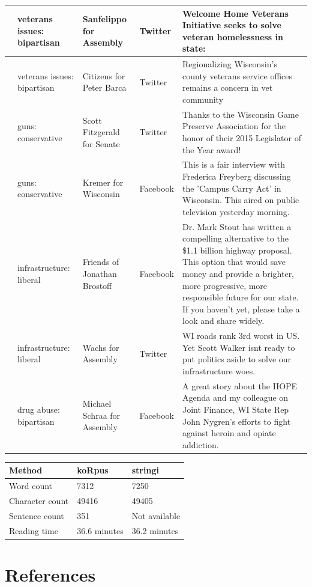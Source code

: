 \documentclass[12pt,]{article}
\begin{document}
\begin{longtable}[t]{>{\raggedright\arraybackslash}p{.65in}|>{\raggedright\arraybackslash}p{.6in}|>{\raggedright\arraybackslash}p{.7in}|>{\raggedright\arraybackslash}p{.6in}|>{\raggedright\arraybackslash}p{3in}}
\hline
6 & veterans issues: bipartisan & Sanfelippo for Assembly & Twitter & Welcome Home Veterans Initiative seeks to solve veteran homelessness in state:\\
\hline
7 & veterans issues: bipartisan & Citizens for Peter Barca & Twitter & Regionalizing Wisconsin's county veterans service offices remains a concern in vet community\\
\hline
8 & guns: conservative & Scott Fitzgerald for Senate & Twitter & Thanks to the Wisconsin Game Preserve Association for the honor of their 2015 Legislator of the Year award!\\
\hline
9 & guns: conservative & Kremer for Wisconsin & Facebook & This is a fair interview with Frederica Freyberg discussing the 'Campus Carry Act' in Wisconsin.  This aired on public television yesterday morning.\\
\hline
10 & infrastructure: liberal & Friends of Jonathan Brostoff & Facebook & Dr. Mark Stout has written a compelling alternative to the \$1.1 billion highway proposal. This option that would save money and provide a brighter, more progressive, more responsible future for our state. If you haven't yet, please take a look and share widely.\\
\hline
11 & infrastructure: liberal & Wachs for Assembly & Twitter & WI roads rank 3rd worst in US. Yet Scott Walker isnt ready to put politics aside to solve our infrastructure woes.\\
\hline
12 & drug abuse: bipartisan & Michael Schraa for Assembly & Facebook & A great story about the HOPE Agenda and my colleague on Joint Finance, WI State Rep John Nygren's efforts to fight against heroin and opiate addiction.\\
\hline
\end{longtable}

\begin{tabular}{l|l|l}
\hline
Method & koRpus & stringi\\
\hline
Word count & 7312 & 7250\\
\hline
Character count & 49416 & 49405\\
\hline
Sentence count & 351 & Not available\\
\hline
Reading time & 36.6 minutes & 36.2 minutes\\
\hline
\end{tabular}

\hypertarget{references}{%
\section*{References}\label{references}}
\end{document}
